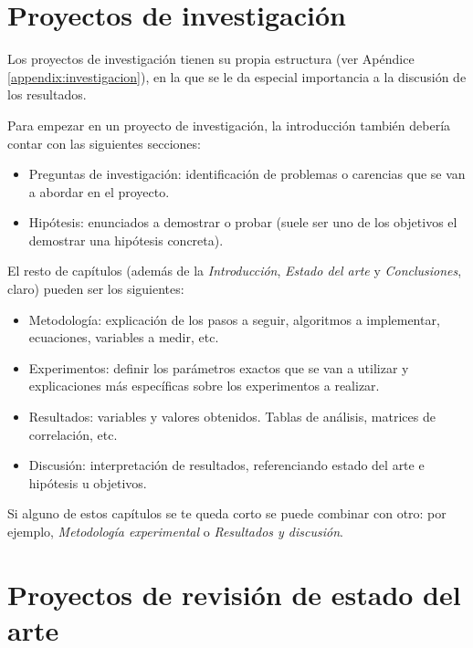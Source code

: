 \section{Proyectos de investigación}
Los proyectos de investigación tienen su propia estructura (ver Apéndice \ref{appendix:investigacion}), en la que se le da especial importancia a la discusión de los resultados. 

Para empezar en un proyecto de investigación, la introducción también debería contar con las siguientes secciones:
    \begin{itemize}
                \item Preguntas de investigación: identificación de problemas o carencias que se van a abordar en el proyecto.
                \item Hipótesis: enunciados a demostrar o probar (suele ser uno de los objetivos el demostrar una hipótesis concreta).
                
    \end{itemize}

El resto de capítulos (además de la \textit{Introducción}, \textit{Estado del arte} y \textit{Conclusiones}, claro) pueden ser los siguientes:
\begin{itemize}
    \item Metodología: explicación de los pasos a seguir, algoritmos a implementar, ecuaciones, variables a medir, etc.
    \item Experimentos: definir los parámetros exactos que se van a utilizar y explicaciones más específicas sobre los experimentos a realizar.
    \item Resultados: variables y valores obtenidos. Tablas de análisis, matrices de correlación, etc.
    \item Discusión: interpretación de resultados, referenciando estado del arte e hipótesis u objetivos.
\end{itemize}
    
Si alguno de estos capítulos se te queda corto se puede combinar con otro: por ejemplo, \textit{Metodología experimental} o \textit{Resultados y discusión}.
        
\section{Proyectos de revisión de estado del arte} 

